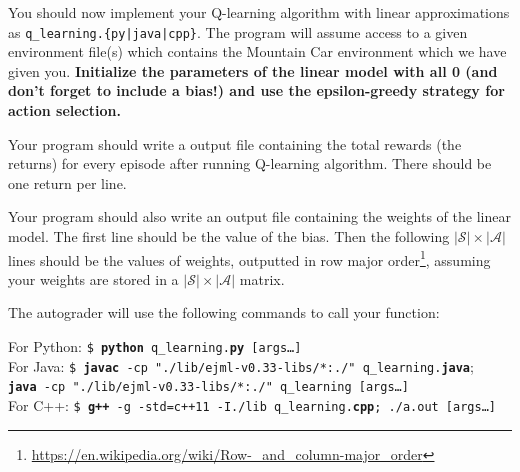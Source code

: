 \documentclass[11pt,addpoints,answers]{exam}
\begin{document}
You should now implement your Q-learning algorithm with linear approximations as \newline\texttt{q\_learning.\{py|java|cpp\}}. The program will assume access to a given environment file(s) which contains the Mountain Car environment which we have given you.  \textbf{Initialize the parameters of the linear model with all 0 (and don't forget to include a bias!) and use the epsilon-greedy strategy for action selection.}

Your program should write a output file containing the total rewards (the returns) for every episode after running Q-learning algorithm. There should be one return per line.

Your program should also write an output file containing the weights of the linear model. The first line should be the value of the bias. Then the following $|\mathcal{S}| \times |\mathcal{A}|$ lines should be the values of weights, outputted in row major order\footnote{\url{https://en.wikipedia.org/wiki/Row-_and_column-major_order}}, assuming your weights are stored in a $|\mathcal{S}| \times |\mathcal{A}|$ matrix.

The autograder will use the following commands to call your function:

\begin{tabbing}
For Python: \=\texttt{\$ \textbf{python} q\_learning.\textbf{py} [args\dots]}\\
For Java: \>\texttt{\$ \textbf{javac} -cp "./lib/ejml-v0.33-libs/*:./" q\_learning.\textbf{java}};\\ \>  \texttt{\textbf{java} -cp "./lib/ejml-v0.33-libs/*:./" q\_learning [args\dots]}\\
For C++: \>\texttt{\$ \textbf{g++} -g -std=c++11 -I./lib q\_learning.\textbf{cpp}; ./a.out [args\dots]}\\
\end{tabbing}
\end{document}
